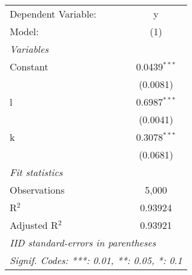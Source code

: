 \begingroup
\centering
\begin{tabular}{lc}
   \tabularnewline \midrule \midrule
   Dependent Variable: & y\\  
   Model:              & (1)\\  
   \midrule
   \emph{Variables}\\
   Constant            & 0.0439$^{***}$\\   
                       & (0.0081)\\   
   l                   & 0.6987$^{***}$\\   
                       & (0.0041)\\   
   k                   & 0.3078$^{***}$\\   
                       & (0.0681)\\   
   \midrule
   \emph{Fit statistics}\\
   Observations        & 5,000\\  
   R$^2$               & 0.93924\\  
   Adjusted R$^2$      & 0.93921\\  
   \midrule \midrule
   \multicolumn{2}{l}{\emph{IID standard-errors in parentheses}}\\
   \multicolumn{2}{l}{\emph{Signif. Codes: ***: 0.01, **: 0.05, *: 0.1}}\\
\end{tabular}
\par\endgroup

